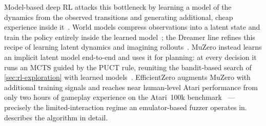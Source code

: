 Model-based deep RL attacks this bottleneck by learning a model of the dynamics from the observed
transitions and generating additional, cheap experience inside it~\cite{moerland_model-based_2022}.
World models compress observations into a latent state and train the policy entirely inside the
learned model~\cite{ha_world_2018}; the Dreamer line refines this recipe of learning latent
dynamics and imagining rollouts~\cite{hafner_learning_2019,hafner_mastering_2024}.
MuZero instead learns an implicit latent model end-to-end and uses it for planning:
at every decision it runs an MCTS guided by the PUCT rule, reuniting the bandit-based search of
\cref{sec:rl-exploration} with learned models~\cite{schrittwieser_mastering_2020}.
EfficientZero augments MuZero with additional training signals and reaches near human-level Atari
performance from only two hours of gameplay experience on the Atari~100k
benchmark~\cite{ye_mastering_2021,kaiser_model-based_2024} --- precisely the
limited-interaction regime an emulator-based fuzzer operates in.
 describes the algorithm in detail.
